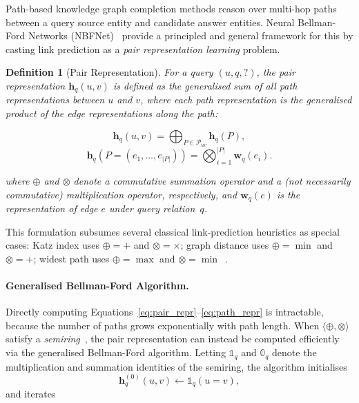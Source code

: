 \documentclass[10pt,journal,compsoc]{IEEEtran}
\newtheorem{definition}{Definition}[section]
\begin{document}
Path-based knowledge graph completion methods reason over multi-hop paths between
a query source entity and candidate answer entities.
Neural Bellman-Ford Networks (NBFNet)~\cite{zhu2021neural} provide a principled
and general framework for this by casting link prediction as a \emph{pair
representation learning} problem.

\begin{definition}[Pair Representation]
\label{def:pair_repr}
For a query $(u, q, ?)$, the pair representation $\mathbf{h}_q(u,v)$ is defined
as the \emph{generalised sum} of all path representations between $u$ and $v$,
where each path representation is the \emph{generalised product} of the edge
representations along the path:

\begin{equation}
  \mathbf{h}_q(u,v)
    = \bigoplus_{P \in \mathcal{P}_{uv}} \mathbf{h}_q(P),
  \label{eq:pair_repr}
\end{equation}
\begin{equation}
  \mathbf{h}_q(P = (e_1,\ldots,e_{|P|}))
    = \bigotimes_{i=1}^{|P|} \mathbf{w}_q(e_i).
  \label{eq:path_repr}
\end{equation}

where $\oplus$ and $\otimes$ denote a commutative summation operator and a
(not necessarily commutative) multiplication operator, respectively, and
$\mathbf{w}_q(e)$ is the representation of edge $e$ under query relation~$q$.
\end{definition}

\noindent
This formulation subsumes several classical link-prediction heuristics as special
cases: Katz index uses $\oplus{=}+$ and $\otimes{=}{\times}$; graph distance uses
$\oplus{=}\min$ and $\otimes{=}+$; widest path uses $\oplus{=}\max$ and
$\otimes{=}\min$~\cite{zhu2021neural}.

\paragraph*{Generalised Bellman-Ford Algorithm.}
Directly computing Equations~\eqref{eq:pair_repr}--\eqref{eq:path_repr} is
intractable, because the number of paths grows exponentially with path length.
When $\langle\oplus,\otimes\rangle$ satisfy a \emph{semiring}~\cite{zhu2021neural},
the pair representation can instead be computed efficiently via the generalised
Bellman-Ford algorithm.
Letting $\mathbb{1}_q$ and $\mathbb{0}_q$ denote the multiplication and summation
identities of the semiring, the algorithm initialises
\begin{equation}
  \mathbf{h}_q^{(0)}(u,v)
    \leftarrow \mathbb{1}_q(u = v),
  \label{eq:nbfnet_init}
\end{equation}
and iterates
\end{document}
